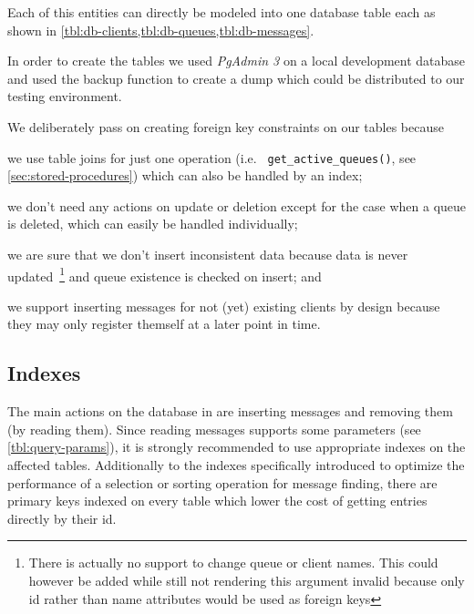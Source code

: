 \documentclass[a4paper, oneside]{csthesis}
\begin{document}
    Each of this entities can directly be modeled into one database table each
    as shown in \cref{tbl:db-clients,tbl:db-queues,tbl:db-messages}.

    In order to create the tables we used {\it PgAdmin 3} on a local
    development database and used the backup function to create a dump which
    could be distributed to our testing environment.
    
    We deliberately pass on creating foreign key constraints on our tables
    because 
    \begin{inparaenum}
        \item we use table joins for just one operation (i.e. {\tt
        get\_active\_queues()}, see \cref{sec:stored-procedures}) which can also
        be handled by an index; 
        \item we don't need any actions on update or deletion except for the
        case when a queue is deleted, which can easily be handled individually;
        \item we are sure that we don't insert inconsistent data because data is
        never updated~\footnote{There is actually no support to change queue or
        client names. This could however be added while still not rendering this
        argument invalid because only id rather than name attributes would be
        used as foreign keys} and queue existence is checked on insert; and
        \item we support inserting messages for not (yet) existing clients by
        design because they may only register themself at a later point in time.
    \end{inparaenum}

\subsection{Indexes}
    The main actions on the database in \telesto{} are inserting messages and
    removing them (by reading them). Since reading messages supports some
    parameters (see \cref{tbl:query-params}), it is strongly recommended to use
    appropriate indexes on the affected tables. Additionally to the indexes
    specifically introduced to optimize the performance of a selection or
    sorting operation for message finding, there are primary keys indexed on
    every table which lower the cost of getting entries directly by their id.
    
\end{document}
